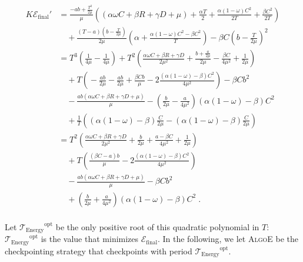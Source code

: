 \documentclass[a4paper]{article}
\newcommand{\ema}[1]{\ensuremath{#1}\xspace}
\newcommand{\ccc}{\ema{C}}
\newcommand{\rrr}{\ema{R}}
\newcommand{\ddd}{\ema{D}}
\newcommand{\period}{T}
\renewcommand{\time}[1][]{\ema{\mathcal{T}_{\text{#1}}}}
\newcommand{\toptE}{\ema{\time[Energy]^{\text{opt}}}}
\newcommand{\E}[1][]{\ema{\mathcal{E}_{\text{#1}}}}
\newcommand{\efin}{\E[final]}
\newcommand{\workduringckpt}{\omega}
\newcommand{\cosi}{\alpha}
\newcommand{\ios}{\beta}
\newcommand{\dos}{\gamma}
\newcommand{\algoE}{\textsc{AlgoE}\xspace}
\begin{document}
\begin{align*}
K\efin' 
&= \frac{-ab \!+\! \frac{\period^2}{2\mu}}{\mu} \!\!\left ( \!\left (\cosi \workduringckpt \ccc 
\!+\! \ios \rrr\!+\! \dos \ddd \!+\! \mu\right ) \! +\! \frac{\cosi \period}{2} \!+\! \frac{\cosi(1-\workduringckpt) \ccc^2}{2\period}
\!+\! \frac{\ios \ccc^2}{2\period}\! \right ) \\
& \quad+ \frac{\left ( \period \!-\! a \right )\!(b \!-\! \frac{\period}{2\mu})}{2\mu}\!\! \left ( \cosi \!+\! \frac{\cosi(1-\workduringckpt)\ccc^2 \!-\! \ios\ccc^2}{\period} \right ) \!-\! \ios \ccc \left (b \!-\! \frac{\period}{2\mu} \right)^2 \\
&= \period^3 \!\!\left (\!\frac{1}{4\mu} \!-\!\frac{1}{4\mu}\! \right ) \!+\! \period^2\!\! \left ( \frac{\cosi \workduringckpt \ccc \!+\! \ios \rrr \!+\! \dos \ddd}{2\mu^2} \!+\! \frac{b \!+\!\frac{a}{2\mu}}{2\mu} \!-\! \frac{\ios \ccc}{4\mu^2} \!+\!\frac{1}{2\mu}\right )  \\
& \quad+ \period \left ( \!-\!\frac{ab}{2\mu}\! -\!\frac{ab}{2\mu} \!+\!\frac{\ios \ccc b}{\mu}  \!-\! 2\frac{( \cosi(1-\workduringckpt) \!-\! \ios) \ccc^2}{4\mu^2} \right )  \!-\! \ios \ccc b^2\\
&\quad - \frac{ab \left (\cosi \workduringckpt \ccc \!+\! \ios \rrr \!+\! \dos \ddd \!+\! \mu \right )}{\mu} \!-\!\left ( \frac{b}{2\mu}\!-\!\frac{a}{4\mu^2}\right )\!(\cosi(1-\workduringckpt)\!-\!\ios)\ccc^2 \\
& \quad + \frac{1}{\period}\!\! \left (\left ( \cosi(1-\workduringckpt)\!-\! \ios\right ) \frac{\ccc}{2\mu} \!-\! \left ( \cosi(1-\workduringckpt)\!-\! \ios\right ) \frac{\ccc}{2\mu} \right )\\
&= \period^2 \left (\frac{\cosi \workduringckpt \ccc \!+\! \ios \rrr \!+\! \dos \ddd}{2\mu^2} \!+\! \frac{b}{2 \mu} \!+\! \frac{a \!-\! \ios \ccc}{4\mu^2} \!+\!\frac{1}{2\mu}\right ) \\
&\quad + \period \left ( \frac{(\ios \ccc\!-\!a) b}{\mu}\!-\! 2\frac{(\cosi(1-\workduringckpt) \!-\! \ios) \ccc^2}{4\mu^2}  \right ) \\
&\quad  - \frac{ab \left ( \cosi\workduringckpt \ccc \!+\! \ios \rrr \!+\! \dos \ddd \!+\! \mu \right  )}{\mu}\! - \!\ios \ccc b^2 \\
&\quad + \left ( \frac{b}{2\mu}\!+\!\frac{a}{4\mu^2}\right )\!(\cosi(1-\workduringckpt)\!-\!\ios)\ccc^2 \; .\\
\end{align*}

Let $\toptE$ be the only positive root of this quadratic polynomial in $T$:  $\toptE$ is 
the value that minimizes \efin.
In the following, we let \algoE be the checkpointing strategy that checkpoints with period \toptE.
\end{document}
